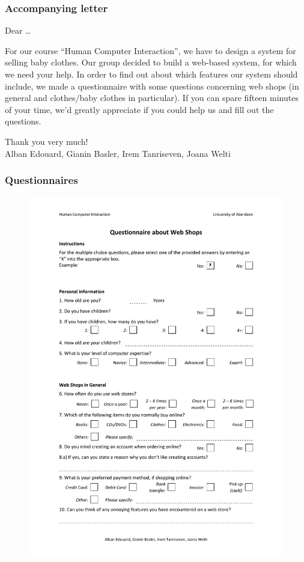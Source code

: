 \subsubsection{Accompanying letter}\label{sec:letter}
Dear \dots

For our course ``Human Computer Interaction'', we have to design a system for selling baby clothes. Our group decided to build a web-based system, for which we need your help. In order to find out about which features our system should include, we made a questionnaire with some questions concerning web shops (in general and clothes/baby clothes in particular).
If you can spare fifteen minutes of your time, we'd greatly appreciate if you could help us and fill out the questions.

Thank you very much!\\
Alban Edouard, Gianin Basler, Irem Tanriseven, Joana Welti


\subsubsection{Questionnaires}
\begin{figure}[t]
\centering
\includegraphics[width=1.0\textwidth]{User_Involvement_Methods/Questionnaires/Questionnaire_Web_Shops_v2.pdf}
\end{figure}

